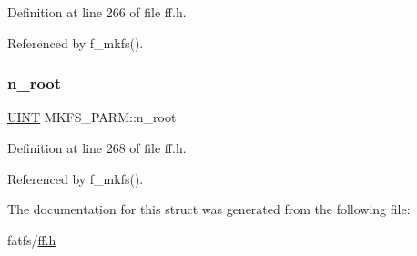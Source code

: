 Definition at line 266 of file ff.\+h.



Referenced by f\+\_\+mkfs().

\mbox{\label{structMKFS__PARM_a2b8a26b614381e0c2e0ff26f138feea6}} 
\subsubsection{\texorpdfstring{n\+\_\+root}{n\_root}}
{\footnotesize\ttfamily \hyperlink{ff_8h_a36cb3b01d81ffd844bbbfb54003e06ec}{U\+I\+NT} M\+K\+F\+S\+\_\+\+P\+A\+R\+M\+::n\+\_\+root}



Definition at line 268 of file ff.\+h.



Referenced by f\+\_\+mkfs().



The documentation for this struct was generated from the following file\+:\begin{DoxyCompactItemize}
\item 
fatfs/\hyperlink{ff_8h}{ff.\+h}\end{DoxyCompactItemize}
